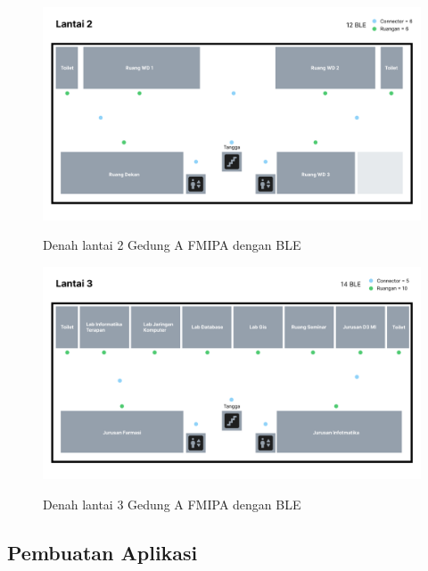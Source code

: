\begin{enumerate}
\begin{figure}[H]
\centering
{\includegraphics [scale = 0.2]{gambar/bab4/Denah-2-BLE}}
\caption{Denah lantai 2 Gedung A FMIPA dengan BLE}
\label{img:denah_2_ble}
\end{figure}

\begin{figure}[H]
\centering
{\includegraphics [scale = 0.2]{gambar/bab4/Denah-3-BLE}}
\caption{Denah lantai 3 Gedung A FMIPA dengan BLE}
\label{img:denah_3_ble}
\end{figure}
    
	\end{enumerate}
	
	
\newpage
\subsection{Pembuatan Aplikasi}

